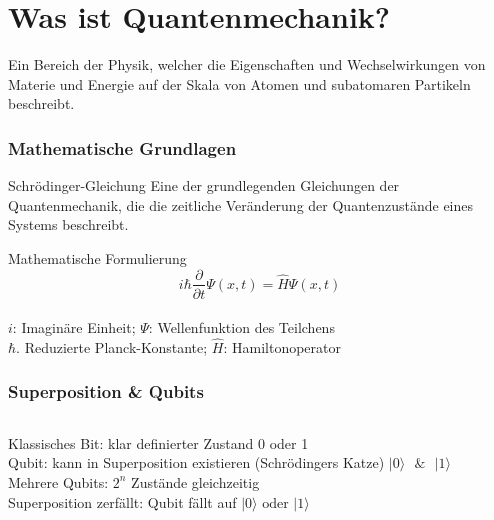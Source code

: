 \section{Was ist Quantenmechanik?}
\begin{frame}
	\begin{Definition}
		Ein Bereich der Physik, welcher die Eigenschaften und Wechselwirkungen von Materie und Energie auf der Skala von Atomen und subatomaren Partikeln beschreibt.
	\end{Definition}
\end{frame}

\begin{frame}
	\frametitle{Mathematische Grundlagen}
	\begin{block}{Schrödinger-Gleichung}
		Eine der grundlegenden Gleichungen der Quantenmechanik, die die zeitliche Veränderung der Quantenzustände eines Systems beschreibt.
	\end{block}
	\pause
	\begin{alertblock}{Mathematische Formulierung}
		\[i \hbar \frac{\partial}{\partial t} \Psi(x,t) = \hat{H} \Psi(x,t)\]\\
		$i$: Imagin{\"a}re Einheit; $\Psi$: Wellenfunktion des Teilchens\\
		$\hbar$. Reduzierte Planck-Konstante; $\hat{H}$: Hamiltonoperator
	\end{alertblock}
\end{frame}

\begin{frame}
	\frametitle{Superposition \& Qubits}
	\begin{columns}
		\begin{column}{0.48\linewidth}
			Klassisches Bit: klar definierter Zustand \textrightarrow { }0 oder 1\\
			\vspace{0.5em}
			Qubit: kann in Superposition existieren (Schr{\"o}dingers Katze)
			$|0\rangle{\text{ }}\&{\text{ }}|1\rangle$\\
			\vspace{0.5em}
			Mehrere Qubits: $2^n$ Zust{\"a}nde gleichzeitig\\
			\vspace{0.5em}
			Superposition zerf{\"a}llt: Qubit f{\"a}llt auf $|0\rangle\text{ oder }|1\rangle$
		\end{column}
		\begin{column}{0.48\linewidth}
		\end{column}
	\end{columns}
\end{frame}

